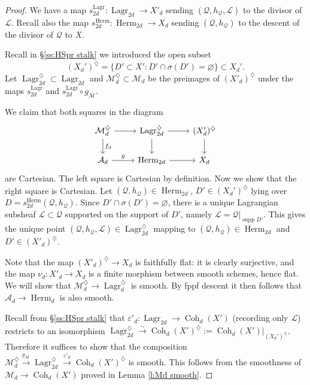 \documentclass[reqno]{amsart}
\numberwithin{equation}{section}
\newcommand{\Cal}[1]{\mathcal{#1}}
\newcommand{\co}{\colon}
\DeclareMathOperator{\Herm}{Herm}
\DeclareMathOperator{\Lagr}{Lagr}
\DeclareMathOperator{\Coh}{Coh}
\DeclareMathOperator{\supp}{supp}
\newcommand{\isom}{\stackrel{\sim}{\to}}
\newcommand\xr{\xrightarrow}
\renewcommand\c{\circ}
\newcommand\vn{\varnothing}
\newcommand{\e}{\varepsilon}
\newcommand\dm{\diamondsuit}
\newcommand\cL{\mathcal{L}}
\newcommand\cM{\mathcal{M}}
\newcommand\cQ{\mathcal{Q}}
\theoremstyle{remark}
\numberwithin{equation}{section}
\begin{document}
\begin{proof}
We have a map $s^{\Lagr}_{2d} \co \Lagr_{2d}\to X'_{d}$ sending $(\cQ,h_{\cQ},\cL)$ to the divisor of $\cL$. Recall also the map $s^{\Herm}_{2d}: \Herm_{2d}\to X_{d}$ sending $(\cQ,h_{\cQ})$ to the descent of the divisor of $\cQ$ to $X$.

Recall in \S\ref{ss:HSpr stalk} we introduced the open subset 
\[
(X_d')^{\dm} = \{D' \subset X' \co D' \cap \sigma(D') = \vn\} \subset X_d'.
\]
Let $\Lagr_{2d}^{\dm} \subset \Lagr_{2d}$ and $\Cal{M}_d^{\dm} \subset \Cal{M}_d$ be the preimages of $(X'_{d})^{\dm}$ under the maps $s^{\Lagr}_{2d}$ and $s^{\Lagr}_{2d}\c g_{\cM}$. 


We claim that both squares in the diagram 
\[
\begin{tikzcd}
\Cal{M}_d^{\dm} \ar[r] \ar[d, "f_d"] & \Lagr_{2d}^{\dm} \ar[d] \ar[r] & (X'_d)^{\dm}\ar[d] \\
\Cal{A}_d \ar[r,"g"] & \Herm_{2d} \ar[r] & X_d
\end{tikzcd}
\]
are Cartesian. The left square is Cartesian by definition. Now we show that the right square is Cartesian. Let $(\cQ ,h_{\cQ})\in \Herm_{2d}$,  $D' \in (X_d')^{\dm}$ lying over $D=s^{\Herm}_{2d}(\cQ,h_{\cQ})$. Since  $D'\cap\sigma(D')=\vn$, there is a unique Lagrangian subsheaf $\cL \subset \cQ$ supported on the support of $D'$, namely $\cL=\cQ|_{\supp D'}$. This gives the unique point $(\cQ,h_{\cQ}, \cL)\in \Lagr^{\dm}_{2d}$ mapping to $(\cQ,h_{\cQ})\in \Herm_{2d}$ and $D'\in (X'_{d})^{\dm}$. 

Note that the map $(X'_d)^{\dm} \rightarrow X_d$ is faithfully flat: it is clearly surjective, and the map $\nu_{d}: X'_d \rightarrow X_d$ is a finite morphism between smooth schemes, hence flat. We will show that $\Cal{M}_d^{\dm} \rightarrow \Lagr_d^{\dm}$ is smooth. By fppf descent it then follows that $\Cal{A}_d \rightarrow \Herm_d$ is also smooth. 

Recall from \S\ref{ss:HSpr stalk} that $\e'_{d}: \Lagr_{2d}\to \Coh_{d}(X')$ (recording only $\cL$) restricts to an isomorphism $\Lagr_{2d}^{\dm}\isom \Coh_{d}(X')^{\dm}:=\Coh_d(X')|_{(X_d')^{\dm}}$. Therefore it suffices to show that the composition $\cM_{d}^{\dm}\xr{g_{\cM}}\Lagr_{2d}^{\dm}\xr{\e'_{d}} \Coh_{d}(X')^{\dm}$ is smooth. This follows from the smoothness of $\cM_{d}\to \Coh_{d}(X')$ proved in Lemma \ref{l:Md smooth}.
\end{proof}
\end{document}
